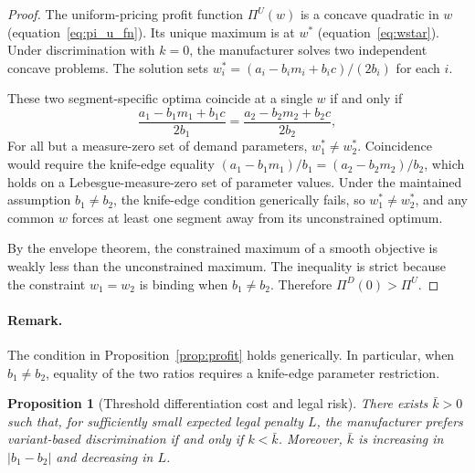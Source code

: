\documentclass[12pt]{article}
\newtheorem{proposition}{Proposition}
\theoremstyle{definition}
\begin{document}
\begin{proof}
The uniform-pricing profit function $\Pi^U(w)$ is a concave quadratic in $w$ (equation~\ref{eq:pi_u_fn}).
Its unique maximum is at $w^*$ (equation~\ref{eq:wstar}).
Under discrimination with $k=0$, the manufacturer solves two independent concave problems. The solution sets $w_i^* = (a_i - b_im_i + b_ic)/(2b_i)$ for each $i$.

These two segment-specific optima coincide at a single $w$ if and only if
\[
\frac{a_1 - b_1 m_1 + b_1 c}{2b_1} = \frac{a_2 - b_2 m_2 + b_2 c}{2b_2},
\]
For all but a measure-zero set of demand parameters, $w_1^* \ne w_2^*$. Coincidence would require the knife-edge equality $(a_1 - b_1 m_1)/b_1 = (a_2 - b_2 m_2)/b_2$, which holds on a Lebesgue-measure-zero set of parameter values. Under the maintained assumption $b_1 \ne b_2$, the knife-edge condition generically fails, so $w_1^* \ne w_2^*$, and any common $w$ forces at least one segment away from its unconstrained optimum.

By the envelope theorem, the constrained maximum of a smooth objective is weakly less than the unconstrained maximum. The inequality is strict because the constraint $w_1 = w_2$ is binding when $b_1 \ne b_2$. Therefore $\Pi^D(0) > \Pi^U$.
\end{proof}

\paragraph{Remark.}
The condition in Proposition~\ref{prop:profit} holds generically. In particular, when $b_1 \ne b_2$, equality of the two ratios requires a knife-edge parameter restriction.

\begin{proposition}[Threshold differentiation cost and legal risk]\label{prop:threshold}
There exists $\bar{k} > 0$ such that, for sufficiently small expected legal penalty $L$, the manufacturer prefers variant-based discrimination if and only if $k < \bar{k}$.
Moreover, $\bar{k}$ is increasing in $|b_1 - b_2|$ and decreasing in $L$.
\end{proposition}
\end{document}
